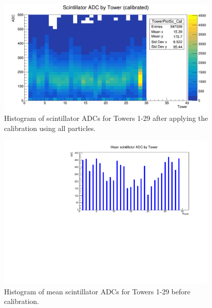 \begin{figure}[hp]
	\centering
	\includegraphics[width=0.95\textwidth]{../Pictures/IDEA/Calibration/new-towerplot-density-calibrated.png}
	\caption{Histogram of scintillator \acrshort{ADC}s for Towers 1-29 after applying the calibration using all particles.}
	\label{figure:testbeam/results/towerplot-raw-calibrated}
\end{figure}

\begin{figure}[hp]
	\centering
	\includegraphics[width=0.95\textwidth]{../Pictures/IDEA/Calibration/new-towerplot-uncal.pdf}
	\caption{Histogram of mean scintillator \acrshort{ADC}s for Towers 1-29 before calibration.}
	\label{figure:testbeam/results/towerplot-mean-uncalibrated-all}
\end{figure}

